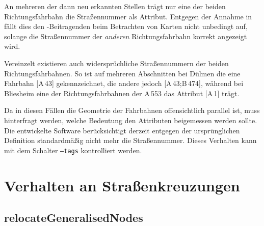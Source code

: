 \documentclass[../main/thesis.tex]{subfiles}
\begin{document}
An mehreren der dann neu erkannten Stellen trägt nur eine der beiden Richtungsfahrbahn die Straßennummer als Attribut.
Entgegen der Annahme in \label{ch:case-selection} fällt dies den \osm-Beitragenden beim Betrachten von Karten nicht unbedingt auf, solange die Straßennummer der \emph{anderen} Richtungsfahrbahn korrekt angezeigt wird.

Vereinzelt existieren auch widersprüchliche Straßennummern der beiden Richtungsfahrbahnen.
So ist auf mehreren Abschnitten bei Dülmen die eine Fahrbahn [A\,43] gekennzeichnet, die andere jedoch [A\,43;B\,474], während bei Bliesheim eine der Richtungsfahrbahnen der A\,553 das Attribut [A\,1] trägt.

Da in diesen Fällen die Geometrie der Fahrbahnen offensichtlich parallel ist, muss hinterfragt werden, welche Bedeutung den Attributen beigemessen werden sollte.
%
%
Die entwickelte Software berücksichtigt derzeit entgegen der ursprünglichen Definition standardmäßig nicht mehr die Straßennummer.
Dieses Verhalten kann mit dem Schalter \texttt{--tags} kontrolliert werden.



\section{Verhalten an Straßenkreuzungen}
\label{ch:result-junctions}

\subsection{relocateGeneralisedNodes}
\label{ch:relocateGeneralisedNodes}
\end{document}
